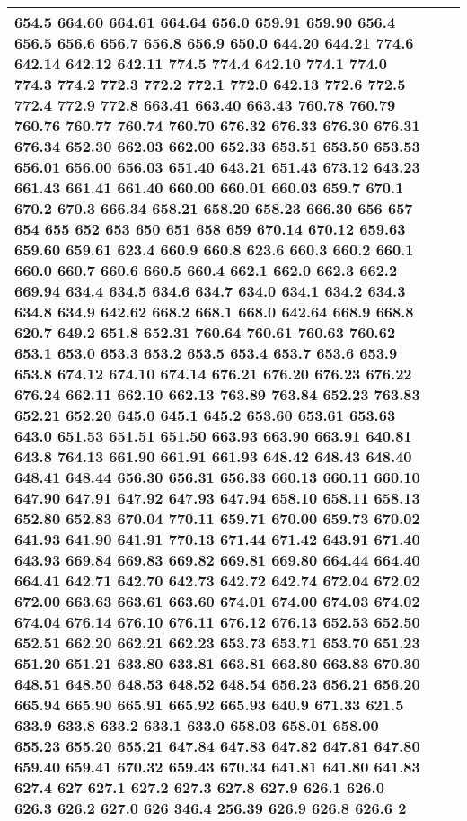 \begin{longtable}{|R{.05in}|L{.5in}||L{5.75in}|}
654.5 664.60 664.61 664.64 656.0 659.91 659.90 656.4 656.5 656.6 656.7 656.8 656.9 650.0 644.20 644.21 774.6 642.14 642.12 642.11 774.5 774.4 642.10 774.1 774.0 774.3 774.2 772.3 772.2 772.1 772.0 642.13 772.6 772.5 772.4 772.9 772.8 663.41 663.40 663.43 760.78 760.79 760.76 760.77 760.74 760.70 676.32 676.33 676.30 676.31 676.34 652.30 662.03 662.00 652.33 653.51 653.50 653.53 656.01 656.00 656.03 651.40 643.21 651.43 673.12 643.23 661.43 661.41 661.40 660.00 660.01 660.03 659.7 670.1 670.2 670.3 666.34 658.21 658.20 658.23 666.30 656 657 654 655 652 653 650 651 658 659 670.14 670.12 659.63 659.60 659.61 623.4 660.9 660.8 623.6 660.3 660.2 660.1 660.0 660.7 660.6 660.5 660.4 662.1 662.0 662.3 662.2 669.94 634.4 634.5 634.6 634.7 634.0 634.1 634.2 634.3 634.8 634.9 642.62 668.2 668.1 668.0 642.64 668.9 668.8 620.7 649.2 651.8 652.31 760.64 760.61 760.63 760.62 653.1 653.0 653.3 653.2 653.5 653.4 653.7 653.6 653.9 653.8 674.12 674.10 674.14 676.21 676.20 676.23 676.22 676.24 662.11 662.10 662.13 763.89 763.84 652.23 763.83 652.21 652.20 645.0 645.1 645.2 653.60 653.61 653.63 643.0 651.53 651.51 651.50 663.93 663.90 663.91 640.81 643.8 764.13 661.90 661.91 661.93 648.42 648.43 648.40 648.41 648.44 656.30 656.31 656.33 660.13 660.11 660.10 647.90 647.91 647.92 647.93 647.94 658.10 658.11 658.13 652.80 652.83 670.04 770.11 659.71 670.00 659.73 670.02 641.93 641.90 641.91 770.13 671.44 671.42 643.91 671.40 643.93 669.84 669.83 669.82 669.81 669.80 664.44 664.40 664.41 642.71 642.70 642.73 642.72 642.74 672.04 672.02 672.00 663.63 663.61 663.60 674.01 674.00 674.03 674.02 674.04 676.14 676.10 676.11 676.12 676.13 652.53 652.50 652.51 662.20 662.21 662.23 653.73 653.71 653.70 651.23 651.20 651.21 633.80 633.81 663.81 663.80 663.83 670.30 648.51 648.50 648.53 648.52 648.54 656.23 656.21 656.20 665.94 665.90 665.91 665.92 665.93 640.9 671.33 621.5 633.9 633.8 633.2 633.1 633.0 658.03 658.01 658.00 655.23 655.20 655.21 647.84 647.83 647.82 647.81 647.80 659.40 659.41 670.32 659.43 670.34 641.81 641.80 641.83 627.4 627 627.1 627.2 627.3 627.8 627.9 626.1 626.0 626.3 626.2 627.0 626 346.4 256.39 626.9 626.8 626.6 2\\\hline

\end{longtable}
